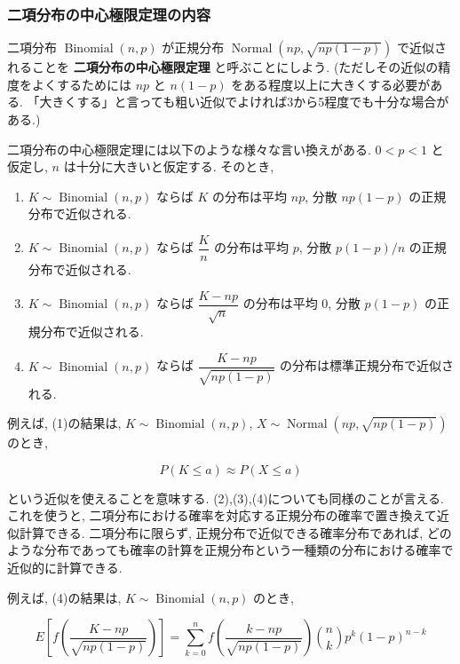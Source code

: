 \documentclass[
  letterpaper,
  DIV=11,
  numbers=noendperiod]{scrartcl}
\begin{document}
\hypertarget{ux4e8cux9805ux5206ux5e03ux306eux4e2dux5fc3ux6975ux9650ux5b9aux7406ux306eux5185ux5bb9}{%
\subsubsection{二項分布の中心極限定理の内容}\label{ux4e8cux9805ux5206ux5e03ux306eux4e2dux5fc3ux6975ux9650ux5b9aux7406ux306eux5185ux5bb9}}

二項分布 \(\operatorname{Binomial}(n, p)\) が正規分布
\(\operatorname{Normal}\left(np, \sqrt{np(1-p)}\right)\)
で近似されることを \textbf{二項分布の中心極限定理} と呼ぶことにしよう.
(ただしその近似の精度をよくするためには \(np\) と \(n(1-p)\)
をある程度以上に大きくする必要がある.
「大きくする」と言っても粗い近似でよければ3から5程度でも十分な場合がある.)

二項分布の中心極限定理には以下のような様々な言い換えがある. \(0<p<1\)
と仮定し, \(n\) は十分に大きいと仮定する. そのとき,

\begin{enumerate}
\def\labelenumi{(\arabic{enumi})}
\item
  \(K\sim\operatorname{Binomial}(n, p)\) ならば \(K\) の分布は平均
  \(np\), 分散 \(np(1-p)\) の正規分布で近似される.
\item
  \(K\sim\operatorname{Binomial}(n, p)\) ならば \(\dfrac{K}{n}\)
  の分布は平均 \(p\), 分散 \(p(1-p)/n\) の正規分布で近似される.
\item
  \(K\sim\operatorname{Binomial}(n, p)\) ならば
  \(\dfrac{K-np}{\sqrt{n}}\) の分布は平均 \(0\), 分散 \(p(1-p)\)
  の正規分布で近似される.
\item
  \(K\sim\operatorname{Binomial}(n, p)\) ならば
  \(\dfrac{K-np}{\sqrt{np(1-p)}}\) の分布は標準正規分布で近似される.
\end{enumerate}

例えば, (1)の結果は, \(K\sim\operatorname{Binomial}(n, p)\),
\(X\sim \operatorname{Normal}\left(np, \sqrt{np(1-p)}\right)\) のとき,

\[
P(K \le a) \approx P(X \le a)
\]

という近似を使えることを意味する.
(2),(3),(4)についても同様のことが言える. これを使うと,
二項分布における確率を対応する正規分布の確率で置き換えて近似計算できる.
二項分布に限らず, 正規分布で近似できる確率分布であれば,
どのような分布であっても確率の計算を正規分布という一種類の分布における確率で近似的に計算できる.

例えば, (4)の結果は, \(K\sim\operatorname{Binomial}(n, p)\) のとき,

\[
E\left[f\left(\dfrac{K-np}{\sqrt{np(1-p)}}\right)\right] =
\sum_{k=0}^n f\left(\dfrac{k-np}{\sqrt{np(1-p)}}\right)
\binom{n}{k}p^k(1-p)^{n-k}
\]
\end{document}
